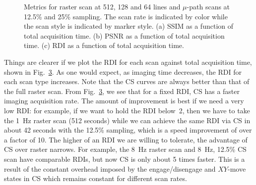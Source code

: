 \documentclass[journal]{IEEEtran}
\begin{document}
\begin{figure}[t!]
  \centering
  \begin{subfigure}{0.329\linewidth}
    \centering
    
    \caption{}
    \label{fig:time_ssim}
  \end{subfigure}
  \begin{subfigure}{0.329\linewidth}
    \centering
    
    \caption{}
    \label{fig:time_psnr}
  \end{subfigure}
  \begin{subfigure}{0.329\linewidth}
    \centering
    
    \caption{}
    \label{fig:time_damage}
  \end{subfigure}
  \caption{Metrics for raster scan at 512, 128 and 64 lines and
    $\mu$-path scans at 12.5\% and 25\% sampling. The scan rate is
    indicated by color while the scan style is indicated by marker
    style. (a) SSIM as a function of total acquisition time. (b) PSNR
    as a function of total acquisition time. (c) RDI as a function of
    total acquisition time.}
  \label{fig:time_vs_metrics}
\end{figure}

Things are clearer if we plot the RDI for each scan against total
acquisition time, shown in Fig.~\ref{fig:time_damage}.
As one would expect, as imaging time
decreases, the RDI for each scan type increases. Note that the CS curves are always better than that of the full raster scan. From
Fig.~\ref{fig:time_damage}, we see that for a fixed RDI, CS has a
faster imaging acquisition rate. The amount of improvement is best if
we need a very low RDI: for example, if we want to hold the RDI below~2, then we have to take the 1~Hz raster scan (512 seconds) while we
can achieve the same RDI via CS in about 42 seconds with the 12.5\%
sampling, which is a speed improvement of over a factor of 10. The higher of an
RDI we are willing to tolerate, the advantage of CS over raster
narrows. For example, the 8~Hz raster scan and 8~Hz, 12.5\% CS scan
have comparable RDIs, but now CS is only about 5 times faster. This is
a result of the constant overhead imposed by the engage/disengage and
$XY$-move states in CS which remains constant for different scan
rates.
\end{document}
